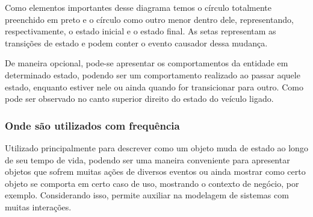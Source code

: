 Como elementos importantes desse diagrama temos o círculo totalmente preenchido em preto e o círculo como outro menor dentro dele, representando, respectivamente, o estado inicial e o estado final. As setas representam as transições de estado e podem conter o evento causador dessa mudança. 

De maneira opcional, pode-se apresentar os comportamentos da entidade em determinado estado, podendo ser um comportamento realizado ao passar aquele estado, enquanto estiver nele ou ainda quando for transicionar para outro. Como pode ser observado no canto superior direito do estado do veículo ligado.

\subsubsection{Onde são utilizados com frequência}
Utilizado principalmente para descrever como um objeto muda de estado ao longo de seu tempo de vida, podendo ser uma maneira conveniente para apresentar objetos que sofrem muitas ações de diversos eventos ou ainda mostrar como certo objeto se comporta em certo caso de uso, mostrando o contexto de negócio, por exemplo. Considerando isso, permite auxiliar na modelagem de sistemas com muitas interações.